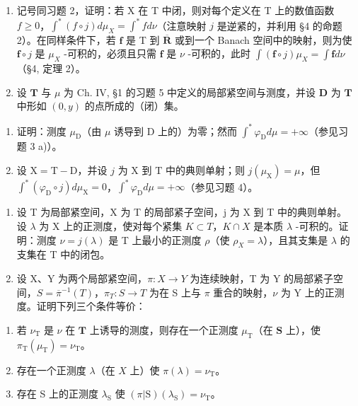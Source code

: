 \begin{enumerate}
\def\labelenumi{\arabic{enumi})}
\setcounter{enumi}{3}
\item
  记号同习题 2，证明：若 X 在 T 中闭，则对每个定义在 T 上的数值函数 \(f \geqslant 0\)，\(\int^{*}(f \circ j) d\mu_{X} = \int^{*} f d\nu\)（注意映射 \(j\) 是逆紧的，并利用 §4 的命题 2）。在同样条件下，若 \(\mathbf{f}\) 是 T 到 \(\overline{\mathbf{R}}\) 或到一个 Banach 空间中的映射，则为使 \(\mathbf{f} \circ j\) 是 \(\mu_{X}\) -可积的，必须且只需 \(\mathbf{f}\) 是 \(\nu\) -可积的，此时 \(\int(\mathbf{f} \circ j)\mu_{X} = \int \mathbf{f} d\nu\)（§4, 定理 2）。
\item
  设 \(\mathbf{T}\) 与 \(\mu\) 为 Ch. IV, §1 的习题 5 中定义的局部紧空间与测度，并设 \(\mathbf{D}\) 为 \(\mathbf{T}\) 中形如 \((0,y)\) 的点所成的（闭）集。
\end{enumerate}

\begin{enumerate}
\def\labelenumi{\alph{enumi})}
\item
  证明：测度 \(\mu_{\mathrm{D}}\)（由 \(\mu\) 诱导到 D 上的）为零；然而 \(\int^{*}\varphi_{\mathrm{D}}d\mu = +\infty\)（参见习题 3 a)）。
\item
  设 \(\mathrm{X} = \mathrm{T} - \mathrm{D}\)，并设 \(j\) 为 \(\mathrm{X}\) 到 \(\mathrm{T}\) 中的典则单射；则 \(j(\mu_{\mathrm{X}}) = \mu\)，但 \(\int^{*} (\varphi_{\mathrm{D}} \circ j) d\mu_{\mathrm{X}} = 0\)，\(\int^{*} \varphi_{\mathrm{D}} d\mu = +\infty\)（参见习题 4）。
\end{enumerate}

\begin{enumerate}
\def\labelenumi{\arabic{enumi})}
\setcounter{enumi}{5}
\item
  设 T 为局部紧空间，X 为 T 的局部紧子空间，j 为 X 到 T 中的典则单射。设 \(\lambda\) 为 X 上的正测度，使对每个紧集 \(K \subset T\)，\(K \cap X\) 是本质 \(\lambda\) -可积的。证明：测度 \(\nu = j(\lambda)\) 是 T 上最小的正测度 \(\rho\)（使 \(\rho_{X} = \lambda\)），且其支集是 \(\lambda\) 的支集在 T 中的闭包。
\item
  设 X、Y 为两个局部紧空间，\(\pi: X \to Y\) 为连续映射，T 为 Y 的局部紧子空间，\(S = \overline{\pi}^{-1}(T)\)，\(\pi_{T}: S \to T\) 为在 S 上与 \(\pi\) 重合的映射，\(\nu\) 为 Y 上的正测度。证明下列三个条件等价：
\end{enumerate}

\begin{enumerate}
\def\labelenumi{\alph{enumi})}
\item
  若 \(\nu_{\mathrm{T}}\) 是 \(\nu\) 在 \(\mathbf{T}\) 上诱导的测度，则存在一个正测度 \(\mu_{\mathrm{T}}\)（在 \(\mathbf{S}\) 上），使 \(\pi_{\mathrm{T}}(\mu_{\mathrm{T}}) = \nu_{\mathrm{T}}\)。
\item
  存在一个正测度 \(\lambda\)（在 \(X\) 上）使 \(\pi (\lambda) = \nu_{\mathrm{T}}\)。
\item
  存在 S 上的正测度 \(\lambda_{\mathrm{S}}\) 使 \((\pi|\mathrm{S})(\lambda_{\mathrm{S}})=\nu_{\mathrm{T}}\)。
\end{enumerate}

